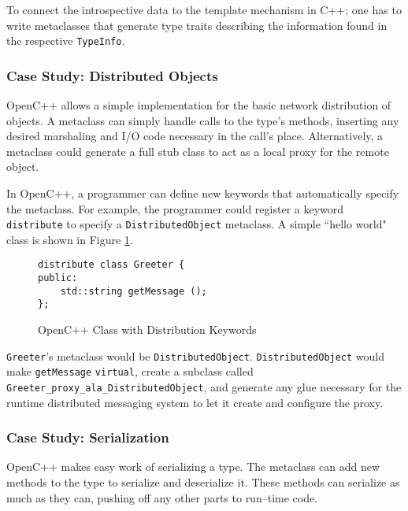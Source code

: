 	To connect the introspective data to the template mechanism in C++; one has to write metaclasses that generate type traits describing the information found in the respective \texttt{TypeInfo}.

	\subsubsection{Case Study: Distributed Objects}
	OpenC++ allows a simple implementation for the basic network distribution of objects.  A metaclass can simply handle calls to the type's methods, inserting any desired marshaling and I/O code necessary in the call's place.  Alternatively, a metaclass could generate a full stub class to act as a local proxy for the remote object.  

	In OpenC++, a programmer can define new keywords that automatically specify the metaclass.  For example, the programmer could register a keyword \texttt{distribute} to specify a \texttt{DistributedObject} metaclass.  A simple ``hello world" class is shown in Figure \ref{fig:ocpp-dist}.

\begin{figure}[ht!]
\begin{verbatim}
distribute class Greeter {
public:
    std::string getMessage ();
};
\end{verbatim}
\caption{OpenC++ Class with Distribution Keywords}
\label{fig:ocpp-dist}
\end{figure}

	\texttt{Greeter}'s metaclass would be \texttt{Dis\-tr\-ib\-ut\-ed\-Ob\-j\-ect}. \texttt{Dis\-tr\-ib\-ut\-ed\-Ob\-j\-ect} would make \texttt{get\-Mes\-s\-age} \texttt{virtual}, create a subclass called \texttt{Greeter\-\_proxy\-\_ala\-\_Dis\-tr\-ib\-ut\-ed\-Ob\-j\-ect}, and generate any glue necessary for the runtime distributed messaging system to let it create and configure the proxy.

	\subsubsection{Case Study: Serialization}
	OpenC++ makes easy work of serializing a type.  The metaclass can add new methods to the type to serialize and deserialize it.  These methods can serialize as much as they can, pushing off any other parts to run--time code.  

